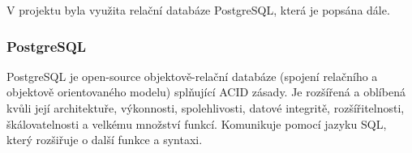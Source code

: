 	V projektu byla využita relační databáze PostgreSQL, která je popsána dále.
	
		\subsubsection{PostgreSQL}
		PostgreSQL je open-source objektově-relační databáze (spojení relačního a objektově orientovaného modelu) splňující ACID zásady. Je rozšířená a oblíbená kvůli její architektuře, výkonnosti, spolehlivosti, datové integritě, rozšířitelnosti, škálovatelnosti a velkému množství funkcí. Komunikuje pomocí jazyku SQL, který rozšiřuje o další funkce a syntaxi. \cite{PostgreSQL}
